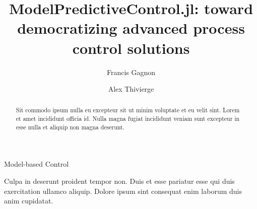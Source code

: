\documentclass{ifacconf}
\begin{document}
\begin{frontmatter}

\title{ModelPredictiveControl.jl: toward democratizing advanced process control solutions}

\author[First]{Francis Gagnon} 
\author[First]{Alex Thivierge} 

\address[First]{Process Observation and Optimization Laboratory (LOOP), Université Laval, Quebec City, G1V 0A6, Canada}
\address[Second]{Process Monitoring Automation and Control group (PMAC), Pfizer Canada ULC, Montreal, H9J 2M5, Canada}

\begin{abstract} 
Sit commodo ipsum nulla eu excepteur sit ut minim voluptate et eu velit sint. Lorem et amet incididunt officia id. Nulla magna fugiat incididunt veniam sunt excepteur in esse nulla et aliquip non magna deserunt. 
\end{abstract}

\begin{keyword}
Model-based Control
\end{keyword}

\end{frontmatter}






\begin{ack}
Culpa in deserunt proident tempor non. Duis et esse pariatur esse qui duis exercitation ullamco aliquip. Dolore ipsum sint consequat enim laborum duis anim cupidatat.
\end{ack}


\end{document}
